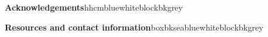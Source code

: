 \documentclass{beamer}
\begin{document}
\begin{frame}[t]
\begin{columns}[T]
\begin{column}{.46\textwidth}
				\begin{customblock}{\textbf{Acknowledgements}}{hhcmblue}{white}{blockbkgrey}
					
				\end{customblock}
			
%					
%			
				\begin{customblock}{\textbf{Resources and contact information}}{boxbkseablue}{white}{blockbkgrey}
					
				\end{customblock}
			
			\end{column}
			
		\end{columns}

	\end{frame}
\end{document}

